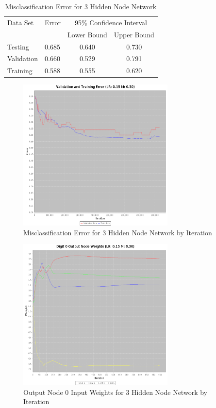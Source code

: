 \documentclass{article}
\begin{document}
\begin{table}
\caption{Misclassification Error for 3 Hidden Node Network}
\begin{center}
\begin{tabular}{llcc}
\toprule
Data Set & Error & \multicolumn{2}{c}{95\% Confidence Interval} \\
\cmidrule(r){3-4}
& & Lower Bound & Upper Bound \\
\midrule
Testing       & 0.685 &  0.640 & 0.730  \\
Validation    & 0.660 &  0.529 & 0.791  \\
Training      & 0.588 &  0.555 & 0.620  \\
\bottomrule
\end{tabular}
\label{table3}
\end{center}
\end{table}

\begin{figure}
\centering
\includegraphics[width=0.7\textwidth]{data/final/3_hidden_node_error.png}
\caption{Misclassification Error for 3 Hidden Node Network by Iteration}
\label{error3}
\end{figure}

\begin{figure}
\centering
\includegraphics[width=0.7\textwidth]{data/final/3_hidden_node_0weight.png}
\caption{Output Node 0 Input Weights for 3 Hidden Node Network by Iteration}
\label{weight3}
\end{figure}
\end{document}
